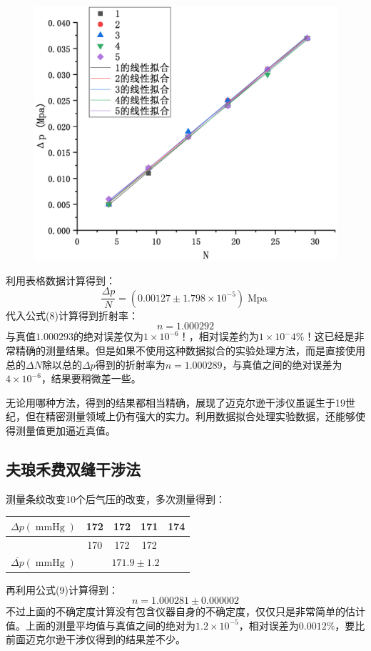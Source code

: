 \documentclass{WHUReport}
\begin{document}
\begin{multicols}{2}
\begin{figure}[H]
		\includegraphics[width=.91\linewidth]{./figs/3.eps}
	\end{figure}
	利用表格数据计算得到：
	\[\frac{\Delta p}{N}=\left(0.00127\pm  1.798\times 10^{-5}\right) \operatorname{Mpa}\]
	代入公式(8)计算得到折射率：
	\begin{equation}
		n=1.000292
	\end{equation}
	与真值$1.000293$的绝对误差仅为$1\times10^{-6}$！，相对误差约为$1\times10^-4\%$！这已经是非常精确的测量结果。但是如果不使用这种数据拟合的实验处理方法，而是直接使用总的$\Delta N$除以总的$\Delta p$得到的折射率为$n=1.000289$，与真值之间的绝对误差为$4\times10^{-6}$，结果要稍微差一些。
	
	无论用哪种方法，得到的结果都相当精确，展现了迈克尔逊干涉仪虽诞生于19世纪，但在精密测量领域上仍有强大的实力。利用数据拟合处理实验数据，还能够使得测量值更加逼近真值。
	\subsection{夫琅禾费双缝干涉法}
	测量条纹改变10个后气压的改变，多次测量得到：
	\begin{table}[H]
		\centering
		\begin{tabular}{|c|c|c|c|c|}
			\hline
			$\Delta p(\operatorname{mmHg})$ & 172 & 172 & 171 & 174 \\ \hline
			& 170 & 172 & 172 &     \\ \hline
			$\overline{\Delta p}(\operatorname{mmHg})$&\multicolumn{4}{c|}{$171.9\pm1.2$} \\ \hline
		\end{tabular}
	\end{table}
	再利用公式(9)计算得到：
	\begin{equation}
		n=1.000281\pm0.000002
	\end{equation}
	不过上面的不确定度计算没有包含仪器自身的不确定度，仅仅只是非常简单的估计值。上面的测量平均值与真值之间的绝对为$1.2\times 10^{-5}$，相对误差为$0.0012\%$，要比前面迈克尔逊干涉仪得到的结果差不少。
	

\end{multicols}
\end{document}
